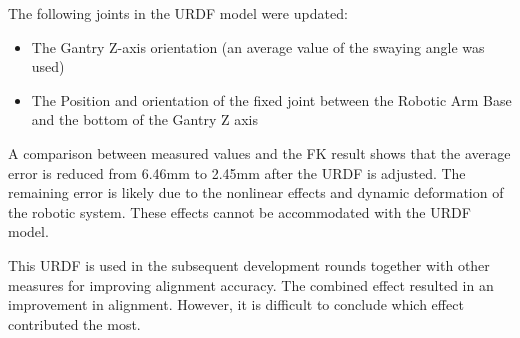 \FloatBarrier

The following joints in the URDF model were updated:

\begin{itemize}
	\item The Gantry Z-axis orientation (an average value of the swaying angle was used)
	\item The Position and orientation of the fixed joint between the Robotic Arm Base and the bottom of the Gantry Z axis
\end{itemize}

A comparison between measured values and the FK result shows that the average error is reduced from 6.46mm to 2.45mm after the URDF is adjusted. The remaining error is likely due to the nonlinear effects and dynamic deformation of the robotic system. These effects cannot be accommodated with the URDF model.

This URDF is used in the subsequent development rounds together with other measures for improving alignment accuracy. The combined effect resulted in an improvement in alignment. However, it is difficult to conclude which effect contributed the most. 
